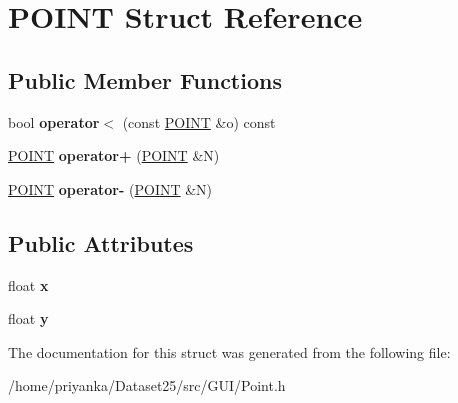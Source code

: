 \hypertarget{structPOINT}{\section{\-P\-O\-I\-N\-T \-Struct \-Reference}
\label{structPOINT}
}
\subsection*{\-Public \-Member \-Functions}
\begin{DoxyCompactItemize}
\item 
\hypertarget{structPOINT_afbd1a896d4866fcd2557b3fd1e33689d}{bool {\bfseries operator$<$} (const \hyperlink{structPOINT}{\-P\-O\-I\-N\-T} \&o) const }\label{structPOINT_afbd1a896d4866fcd2557b3fd1e33689d}

\item 
\hypertarget{structPOINT_a43d64c646fc7a4099bde06942427d7b1}{\hyperlink{structPOINT}{\-P\-O\-I\-N\-T} {\bfseries operator+} (\hyperlink{structPOINT}{\-P\-O\-I\-N\-T} \&\-N)}\label{structPOINT_a43d64c646fc7a4099bde06942427d7b1}

\item 
\hypertarget{structPOINT_a12095762b0a3d46ad3c428ec56ae7e6c}{\hyperlink{structPOINT}{\-P\-O\-I\-N\-T} {\bfseries operator-\/} (\hyperlink{structPOINT}{\-P\-O\-I\-N\-T} \&\-N)}\label{structPOINT_a12095762b0a3d46ad3c428ec56ae7e6c}

\end{DoxyCompactItemize}
\subsection*{\-Public \-Attributes}
\begin{DoxyCompactItemize}
\item 
\hypertarget{structPOINT_a56943cc8ef53b6bb798610a548728d8b}{float {\bfseries x}}\label{structPOINT_a56943cc8ef53b6bb798610a548728d8b}

\item 
\hypertarget{structPOINT_a62563dfc362243a810cc617fda56d091}{float {\bfseries y}}\label{structPOINT_a62563dfc362243a810cc617fda56d091}

\end{DoxyCompactItemize}


\-The documentation for this struct was generated from the following file\-:\begin{DoxyCompactItemize}
\item 
/home/priyanka/\-Dataset25/src/\-G\-U\-I/\-Point.\-h\end{DoxyCompactItemize}
